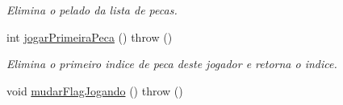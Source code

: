 \begin{DoxyCompactItemize}
\begin{DoxyCompactList}\small\item\em Elimina o pelado da lista de pecas. \item\end{DoxyCompactList}\item 
int \hyperlink{classJogador_af2737d00fb2e622a3f6efc16fd2ffe53}{jogarPrimeiraPeca} ()  throw ()
\begin{DoxyCompactList}\small\item\em Elimina o primeiro indice de peca deste jogador e retorna o indice. \item\end{DoxyCompactList}\item 
\hypertarget{classJogador_adaa1fda004b5db6610b0c8976634c70f}{
void \hyperlink{classJogador_adaa1fda004b5db6610b0c8976634c70f}{mudarFlagJogando} ()  throw ()}
\label{classJogador_adaa1fda004b5db6610b0c8976634c70f}


\end{DoxyCompactItemize}
